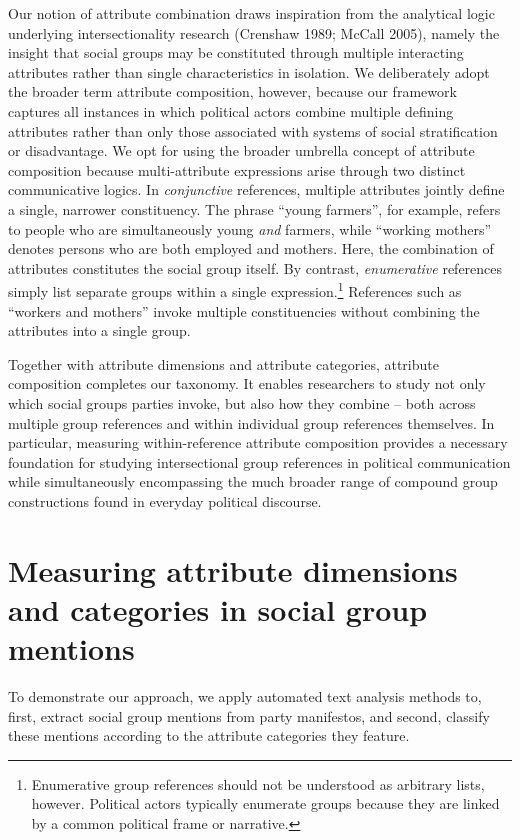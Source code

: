 \documentclass[12pt]{article}
\begin{document}
Our notion of attribute combination draws inspiration from the analytical logic underlying intersectionality research (Crenshaw 1989; McCall 2005), namely the insight that social groups may be constituted through multiple interacting attributes rather than single characteristics in isolation.
We deliberately adopt the broader term attribute composition, however, because our framework captures all instances in which political actors combine multiple defining attributes rather than only those associated with systems of social stratification or disadvantage.
We opt for using the broader umbrella concept of attribute composition because multi-attribute expressions arise through two distinct communicative logics.
In \emph{conjunctive} references, multiple attributes jointly define a single, narrower constituency.
The phrase ``young farmers'', for example, refers to people who are simultaneously young \emph{and} farmers, while ``working mothers'' denotes persons who are both employed and mothers.
Here, the combination of attributes constitutes the social group itself.
By contrast, \emph{enumerative} references simply list separate groups within a single expression.\footnote{Enumerative group references should not be understood as arbitrary lists, however.
  Political actors typically enumerate groups because they are linked by a common political frame or narrative.}
References such as ``workers and mothers'' invoke multiple constituencies without combining the attributes into a single group.

Together with attribute dimensions and attribute categories, attribute composition completes our taxonomy.
It enables researchers to study not only which social groups parties invoke, but also how they combine -- both across multiple group references and within individual group references themselves.
In particular, measuring within-reference attribute composition provides a necessary foundation for studying intersectional group references in political communication while simultaneously encompassing the much broader range of compound group constructions found in everyday political discourse.

\section{Measuring attribute dimensions and categories in social group mentions}\label{measuring-attribute-dimensions-and-categories-in-social-group-mentions}

To demonstrate our approach, we apply automated text analysis methods to, first, extract social group mentions from party manifestos, and second, classify these mentions according to the attribute categories they feature.
\end{document}
